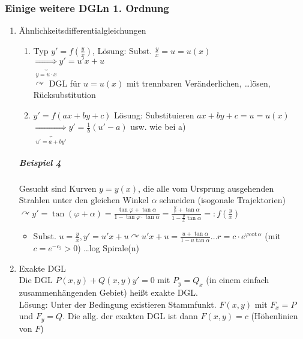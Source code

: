 \documentclass[a4paper]{scrartcl}
\begin{document}
\subsubsection{Einige weitere DGLn 1. Ordnung}
\begin{enumerate}
\item Ähnlichkeitsdifferentialgleichungen 
\begin{enumerate}
\item Typ $y' = f(\frac{y}{x})$, Lösung: Subst. $\frac{y}{x} = u = u(x)$\\
$\underbrace{\Rightarrow}_{y=u \cdot x} y' = u' x + u$\\
$\curvearrowright$ DGL für $u = u(x)$ mit trennbaren Veränderlichen, \dots lösen, Rücksubstitution
\item $y' = f(ax + by + c)$ Lösung: Substituieren $ax + by  +c = u = u(x)$\\
$\underbrace{\Rightarrow}_{u' = a + by'} y' = \frac{1}{b} (u' -a)$ usw. wie bei a)
\end{enumerate}


\subparagraph{Beispiel 4} Gesucht sind Kurven $y= y(x)$, die alle vom Ursprung ausgehenden Strahlen unter den gleichen Winkel $\alpha$ schneiden (isogonale Trajektorien)\\
$\curvearrowright y' = \tan{(\varphi + \alpha )} = \frac{\tan{\varphi} + \tan{\alpha}}{1- \tan{\varphi} \cdot \tan{\alpha} } = \frac{\frac{y}{x} + \tan{\alpha}}{1 - \frac{y}{x} \tan{\alpha} }=: f (\frac{y}{x} )$\\

\begin{itemize}
\item Subst. $u= \frac{y}{x}, y' = u' x + u \curvearrowright u'x + u = \frac{u + \tan{\alpha}}{1 - u \tan{\alpha}} \dots r= c \cdot e^{\varphi \text{cot} \, \alpha}$ (mit $c = e^{-c_2} > 0 $) \dots log Spirale(n)
\end{itemize}

\item Exakte DGL\\
Die DGL $P(x,y) + Q(x,y) y' = 0$ mit $P_y = Q_x$ (in einem einfach zusammenhängenden Gebiet) heißt exakte DGL.\\
Lösung: Unter der Bedingung existieren Stammfunkt. $F(x,y)$ mit $F_x = P$ und $F_y = Q$. Die allg. der exakten DGL ist dann $F(x,y) = c$ (Höhenlinien von $F$)


\end{enumerate}
\end{document}
